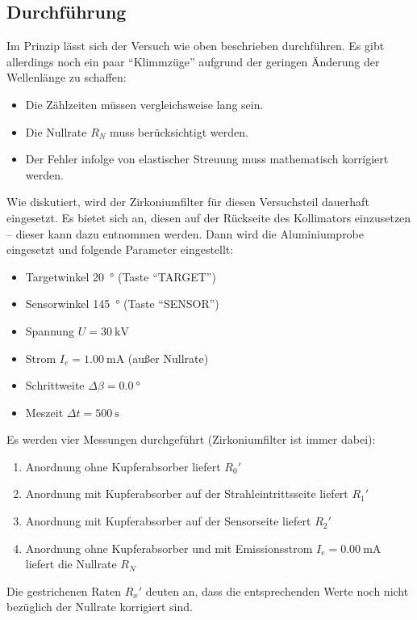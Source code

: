 \documentclass[ngerman,a4paper,twocolumn,twoside]{scrartcl}
\begin{document}
\subsection*{Durchführung}
Im Prinzip lässt sich der Versuch wie oben beschrieben durchführen. Es gibt allerdings noch ein paar \enquote{Klimmzüge} aufgrund der geringen Änderung der Wellenlänge zu schaffen:
\begin{itemize}
\item Die Zählzeiten müssen vergleichsweise lang sein.
\item Die Nullrate $R_N$ muss berücksichtigt werden.
\item Der Fehler infolge von elastischer Streuung muss mathematisch korrigiert werden.
\end{itemize}
Wie diskutiert, wird der Zirkoniumfilter für diesen Versuchsteil dauerhaft eingesetzt. Es bietet sich an, diesen auf der Rückseite des Kollimators einzusetzen -- dieser kann dazu entnommen werden. Dann wird die Aluminiumprobe eingesetzt und folgende Parameter eingestellt:
\begin{itemize}
\item Targetwinkel \SI{20}{\degree} (Taste \enquote{TARGET})
\item Sensorwinkel \SI{145}{\degree} (Taste \enquote{SENSOR})
\item Spannung $U=\SI{30}{\kilo\volt}$
\item Strom $I_e=\SI{1.00}{\milli\ampere}$ (außer Nullrate)
\item Schrittweite $\Delta\beta=\SI{0.0}{\degree}$
\item Meszeit $\Delta t=\SI{500}{\s}$
\end{itemize}
Es werden vier Messungen durchgeführt (Zirkoniumfilter ist immer dabei):
\begin{enumerate}
\item Anordnung ohne Kupferabsorber liefert $R_0'$
\item Anordnung mit Kupferabsorber auf der Strahleintrittsseite liefert $R_1'$
\item Anordnung mit Kupferabsorber auf der Sensorseite liefert $R_2'$
\item Anordnung ohne Kupferabsorber und mit Emissionsstrom $I_e=\SI{0.00}{\milli\ampere}$ liefert die Nullrate $R_N$
\end{enumerate}
Die gestrichenen Raten $R_x'$ deuten an, dass die entsprechenden Werte noch nicht bezüglich der Nullrate korrigiert sind.
\end{document}
